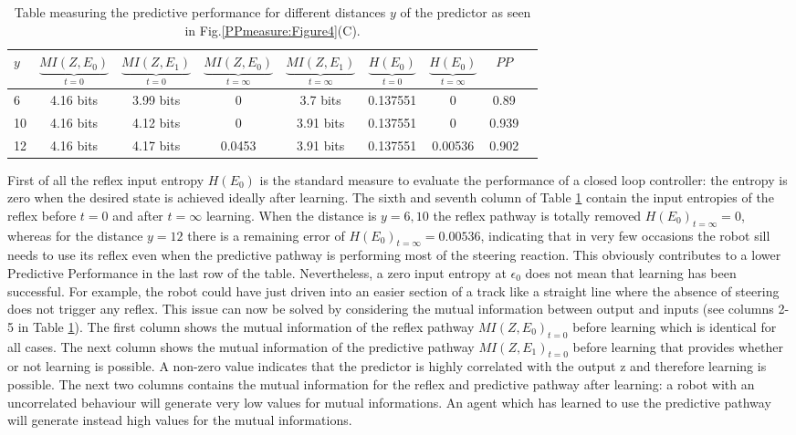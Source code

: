 \begin{table}[htbp]
\addtolength{\tabcolsep}{-2pt}
\caption[Table with entropy values for simple robot]{Table measuring the predictive performance for different distances $y$ of the predictor as seen in Fig.\ref{PPmeasure:Figure4}(C). \label{table:PPmeausure:TableSimplePP}}
\begin{small}
\begin{center}
  \begin{tabular}{|l|c|c|c|c|c|c|c|c|}
    \hline
    $y$ & $\underbrace{MI(Z,E_0)}_{t=0}$ & $\underbrace{MI(Z,E_1)}_{t=0}$ & $\underbrace{MI(Z,E_0)}_{t=\infty}$& $\underbrace{MI(Z,E_1)}_{t=\infty}$ & $\underbrace{H(E_{0})}_{t=0}$ & $\underbrace{H(E_{0})}_{t=\infty}$ & $PP$ \\ \hline
     6 &4.16 bits&3.99 bits&0& 3.7 bits& 0.137551&0&0.89\\ \hline
     10 &4.16 bits&4.12 bits&0& 3.91 bits& 0.137551&0&0.939\\ \hline
     12 &4.16 bits&4.17 bits&0.0453& 3.91 bits& 0.137551&0.00536&0.902\\ \hline
  \end{tabular}
\end{center}
\end{small}
\end{table}

First of all the reflex input entropy $H(E_{0})$ is the standard measure
to evaluate the performance of a closed loop controller: the entropy is zero when
the desired state is achieved ideally after learning.
The sixth and seventh column of Table \ref{table:PPmeausure:TableSimplePP} contain
the input entropies of the reflex before $t=0$ and after $t=\infty$ learning.
When the distance is $y=6,10$ the reflex pathway is totally removed $H(E_{0})_{t=\infty}=0$,
whereas for the distance $y=12$ there is a remaining error of $H(E_{0})_{t=\infty}=0.00536$,
indicating that in very few occasions the robot sill needs to use its reflex even when
the predictive pathway is performing most of the steering reaction.
This obviously contributes to a lower Predictive Performance in the last row of the table.
Nevertheless, a zero input entropy at $\epsilon_0$ does not mean that learning has been
successful. For example, the robot could have just driven into an easier section of a track
like a straight line where the absence of steering does not trigger any reflex.
This issue can now be solved by considering the mutual information between output and inputs
(see columns 2-5 in Table \ref{table:PPmeausure:TableSimplePP}).
The first column shows the mutual information of the reflex pathway $MI(Z,E_0)_{t=0}$
before learning which is identical for all cases.
The next column shows the mutual information of the predictive pathway $MI(Z,E_1)_{t=0}$
before learning that provides whether or not learning is possible.
A non-zero value indicates that the predictor is highly correlated with the output z
and therefore learning is possible.
The next two columns contains the mutual information for the reflex and 
predictive pathway after learning: a robot with an uncorrelated behaviour will generate
very low values for mutual informations.
An agent which has learned to use the predictive pathway will generate instead
high values for the mutual informations.

